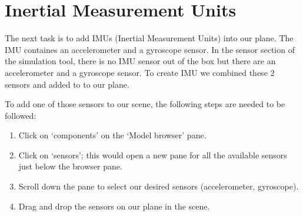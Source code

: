 \section{Inertial Measurement Units}

The next task is to add IMUs (Inertial Measurement Units) into our plane. The IMU containes an accelerometer and a gyroscope sensor. In the sensor section of the simulation tool, there is no IMU sensor out of the box but there are an accelerometer and a gyroscope sensor. To create IMU we combined these 2 sensors and added to to our plane. 

To add one of those sensors to our scene, the following steps are needed to be followed:

\begin{enumerate}
  \item Click on ‘components’ on the ‘Model browser’ pane.
  \item Click on ‘sensors’; this would open a new pane for all the available sensors just below the browser pane.
  \item Scroll down the pane to select our desired sensors (accelerometer, gyroscope).
  \item Drag and drop the sensors on our plane in the scene.
\end{enumerate}



